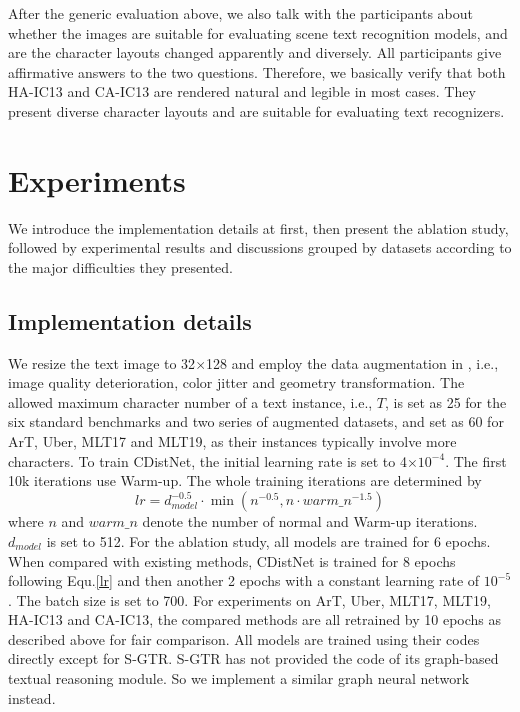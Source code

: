 After the generic evaluation above, we also talk with the participants about whether the images are suitable for evaluating scene text recognition models, and are the character layouts changed apparently and diversely. All participants give affirmative answers to the two questions. Therefore, we basically verify that both HA-IC13 and CA-IC13 are rendered natural and legible in most cases. They present diverse character layouts and are suitable for evaluating text recognizers.


\section{Experiments}
We introduce the implementation details at first, then present the ablation study, followed by experimental results and discussions grouped by datasets according to the major difficulties they presented.

\subsection{Implementation details}
We resize the text image to 32$\times$128 and employ the data augmentation in \citep{ABInet21CVPR}, i.e., image quality deterioration, color jitter and geometry transformation. The allowed maximum character number of a text instance, i.e., $T$, is set as 25 for the six standard benchmarks and two series of augmented datasets, and set as 60 for ArT, Uber, MLT17 and MLT19, as their instances typically involve more characters. To train CDistNet, the initial learning rate is set to 4$\times 10^{-4}$. The first 10k iterations use Warm-up. The whole training iterations are determined by  
\begin{equation}\label{lr}
lr = d_{model}^{-0.5}\cdot\min({n}^{-0.5},{n} \cdot {warm\_n}^{-1.5})
\end{equation}
where $n$ and $warm\_n$ denote the number of normal and Warm-up iterations. $d_{model}$ is set to 512. For the ablation study, all models are trained for 6 epochs. When compared with existing methods, CDistNet is trained for 8 epochs following Equ.\ref{lr} and then another 2 epochs with a constant learning rate of $10^{-5}$. The batch size is set to 700. For experiments on ArT, Uber, MLT17, MLT19, HA-IC13 and CA-IC13, the compared methods are all retrained by 10 epochs as described above for fair comparison. All models are trained using their codes directly except for S-GTR. S-GTR has not provided the code of its graph-based textual reasoning module. So we implement a similar graph neural network instead.


